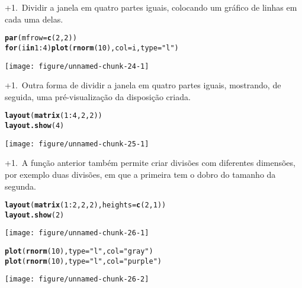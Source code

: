 \documentclass{article}\usepackage[]{graphicx}\usepackage[]{color}
\makeatletter
\def\maxwidth{ %
  \ifdim\Gin@nat@width>\linewidth
    \linewidth
  \else
    \Gin@nat@width
  \fi
}
\newcommand{\hlnum}[1]{\textcolor[rgb]{0.686,0.059,0.569}{#1}}%
\newcommand{\hlstr}[1]{\textcolor[rgb]{0.192,0.494,0.8}{#1}}%
\newcommand{\hlopt}[1]{\textcolor[rgb]{0,0,0}{#1}}%
\newcommand{\hlstd}[1]{\textcolor[rgb]{0.345,0.345,0.345}{#1}}%
\newcommand{\hlkwa}[1]{\textcolor[rgb]{0.161,0.373,0.58}{\textbf{#1}}}%
\newcommand{\hlkwc}[1]{\textcolor[rgb]{0.333,0.667,0.333}{#1}}%
\newcommand{\hlkwd}[1]{\textcolor[rgb]{0.737,0.353,0.396}{\textbf{#1}}}%
\newenvironment{kframe}{%
 \def\at@end@of@kframe{}%
 \ifinner\ifhmode%
  \def\at@end@of@kframe{\end{minipage}}%
  \begin{minipage}{\columnwidth}%
 \fi\fi%
 \def\FrameCommand##1{\hskip\@totalleftmargin \hskip-\fboxsep
 \colorbox{shadecolor}{##1}\hskip-\fboxsep
     \hskip-\linewidth \hskip-\@totalleftmargin \hskip\columnwidth}%
 \MakeFramed {\advance\hsize-\width
   \@totalleftmargin\z@ \linewidth\hsize
   \@setminipage}}%
 {\par\unskip\endMakeFramed%
 \at@end@of@kframe}
\newenvironment{knitrout}{}{} %
\newcounter{graph}[section]
\renewcommand{\thegraph}{\number\numexpr\value{graph}+1\relax.~\stepcounter{graph}}
\makeatother
\begin{document}
\thegraph Dividir a janela em quatro partes iguais, colocando um gráfico de linhas em cada uma delas.
\begin{knitrout}
\color{fgcolor}\begin{kframe}
\begin{alltt}
\hlkwd{par}\hlstd{(}\hlkwc{mfrow} \hlstd{=} \hlkwd{c}\hlstd{(}\hlnum{2}\hlstd{,} \hlnum{2}\hlstd{))}
\hlkwa{for} \hlstd{(i} \hlkwa{in} \hlnum{1}\hlopt{:}\hlnum{4}\hlstd{)} \hlkwd{plot}\hlstd{(}\hlkwd{rnorm}\hlstd{(}\hlnum{10}\hlstd{),} \hlkwc{col} \hlstd{= i,} \hlkwc{type} \hlstd{=} \hlstr{"l"}\hlstd{)}
\end{alltt}
\end{kframe}
\texttt{[image: figure/unnamed-chunk-24-1]} 

\end{knitrout}
\pagebreak
\thegraph Outra forma de dividir a janela em quatro partes iguais, mostrando, de seguida, uma pré-visualização da disposição criada.
\begin{knitrout}
\color{fgcolor}\begin{kframe}
\begin{alltt}
\hlkwd{layout}\hlstd{(}\hlkwd{matrix}\hlstd{(}\hlnum{1}\hlopt{:}\hlnum{4}\hlstd{,} \hlnum{2}\hlstd{,} \hlnum{2}\hlstd{))}
\hlkwd{layout.show}\hlstd{(}\hlnum{4}\hlstd{)}
\end{alltt}
\end{kframe}
\texttt{[image: figure/unnamed-chunk-25-1]} 

\end{knitrout}
\pagebreak
\thegraph A função anterior também permite criar divisões com diferentes dimensões, por exemplo duas divisões, em que a primeira tem o dobro do tamanho da segunda.
\begin{knitrout}
\color{fgcolor}\begin{kframe}
\begin{alltt}
\hlkwd{layout}\hlstd{(}\hlkwd{matrix}\hlstd{(}\hlnum{1}\hlopt{:}\hlnum{2}\hlstd{,} \hlnum{2}\hlstd{,} \hlnum{2}\hlstd{),} \hlkwc{heights} \hlstd{=} \hlkwd{c}\hlstd{(}\hlnum{2}\hlstd{,} \hlnum{1}\hlstd{))}
\hlkwd{layout.show}\hlstd{(}\hlnum{2}\hlstd{)}
\end{alltt}
\end{kframe}
\texttt{[image: figure/unnamed-chunk-26-1]} 
\begin{kframe}\begin{alltt}
\hlkwd{plot}\hlstd{(}\hlkwd{rnorm}\hlstd{(}\hlnum{10}\hlstd{),} \hlkwc{type}\hlstd{=}\hlstr{"l"}\hlstd{,} \hlkwc{col}\hlstd{=}\hlstr{"gray"}\hlstd{)}
\hlkwd{plot}\hlstd{(}\hlkwd{rnorm}\hlstd{(}\hlnum{10}\hlstd{),} \hlkwc{type}\hlstd{=}\hlstr{"l"}\hlstd{,} \hlkwc{col}\hlstd{=}\hlstr{"purple"}\hlstd{)}
\end{alltt}
\end{kframe}
\texttt{[image: figure/unnamed-chunk-26-2]} 

\end{knitrout}
\end{document}
